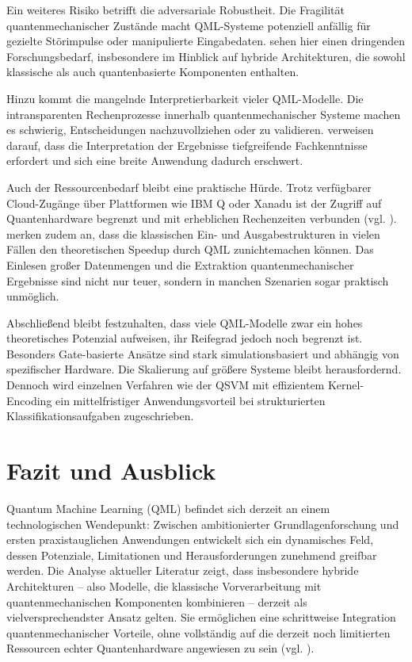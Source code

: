 Ein weiteres Risiko betrifft die adversariale Robustheit. Die Fragilität quantenmechanischer Zustände macht QML-Systeme potenziell anfällig für gezielte Störimpulse oder manipulierte Eingabedaten. \cite{gujjuQuantumMachineLearning2024} sehen hier einen dringenden Forschungsbedarf, insbesondere im Hinblick auf hybride Architekturen, die sowohl klassische als auch quantenbasierte Komponenten enthalten.

Hinzu kommt die mangelnde Interpretierbarkeit vieler QML-Modelle. Die intransparenten Rechenprozesse innerhalb quantenmechanischer Systeme machen es schwierig, Entscheidungen nachzuvollziehen oder zu validieren. \cite{tychola_quantum_2023} verweisen darauf, dass die Interpretation der Ergebnisse tiefgreifende Fachkenntnisse erfordert und sich eine breite Anwendung dadurch erschwert.

Auch der Ressourcenbedarf bleibt eine praktische Hürde. Trotz verfügbarer Cloud-Zugänge über Plattformen wie IBM Q oder Xanadu ist der Zugriff auf Quantenhardware begrenzt und mit erheblichen Rechenzeiten verbunden (vgl. \cite{peral-garciaSystematicLiteratureReview2024}). \cite{zhangRecentAdvancesQuantum2020} merken zudem an, dass die klassischen Ein- und Ausgabestrukturen in vielen Fällen den theoretischen Speedup durch QML zunichtemachen können. Das Einlesen großer Datenmengen und die Extraktion quantenmechanischer Ergebnisse sind nicht nur teuer, sondern in manchen Szenarien sogar praktisch unmöglich.

Abschließend bleibt festzuhalten, dass viele QML-Modelle zwar ein hohes theoretisches Potenzial aufweisen, ihr Reifegrad jedoch noch begrenzt ist. Besonders Gate-basierte Ansätze sind stark simulationsbasiert und abhängig von spezifischer Hardware. Die Skalierung auf größere Systeme bleibt herausfordernd. Dennoch wird einzelnen Verfahren wie der QSVM mit effizientem Kernel-Encoding ein mittelfristiger Anwendungsvorteil bei strukturierten Klassifikationsaufgaben zugeschrieben.


\section{Fazit und Ausblick}
Quantum Machine Learning (QML) befindet sich derzeit an einem technologischen Wendepunkt: Zwischen ambitionierter Grundlagenforschung und ersten praxistauglichen Anwendungen entwickelt sich ein dynamisches Feld, dessen Potenziale, Limitationen und Herausforderungen zunehmend greifbar werden. Die Analyse aktueller Literatur zeigt, dass insbesondere hybride Architekturen – also Modelle, die klassische Vorverarbeitung mit quantenmechanischen Komponenten kombinieren – derzeit als vielversprechendster Ansatz gelten. Sie ermöglichen eine schrittweise Integration quantenmechanischer Vorteile, ohne vollständig auf die derzeit noch limitierten Ressourcen echter Quantenhardware angewiesen zu sein
(vgl. \cite{liuQuantumTrainRethinkingHybrid2024, peral-garciaSystematicLiteratureReview2024}).

